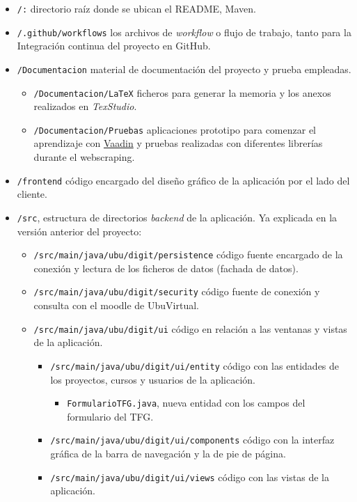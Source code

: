 \begin{itemize}
	\item \texttt{/:} directorio raíz donde se ubican el README, Maven. 
	\item \texttt{/.github/workflows} los archivos de \textit{workflow} o flujo de trabajo, tanto para la Integración continua del proyecto en GitHub.
	\item \texttt{/Documentacion} material de documentación del proyecto y prueba empleadas.
	\begin{itemize}
		\tightlist
		\item \texttt{/Documentacion/LaTeX} ficheros para generar la memoria y los anexos realizados en \emph{TexStudio}.
		\item \texttt{/Documentacion/Pruebas} aplicaciones prototipo para comenzar el aprendizaje con \href{https://vaadin.com/}{Vaadin} y pruebas realizadas con diferentes librerías durante el webscraping.
	\end{itemize}
	\item \texttt{/frontend} código encargado del diseño gráfico de la aplicación por el lado del cliente.
	\item \texttt{/src}, estructura de directorios \emph{backend} de la aplicación. Ya explicada en la versión anterior del proyecto:
		\begin{itemize}
			\item \texttt{/src/main/java/ubu/digit/persistence} código fuente encargado de la conexión y lectura de los ficheros de datos (fachada de datos).		
			\item \texttt{/src/main/java/ubu/digit/security} código fuente de conexión y consulta con el moodle de UbuVirtual.
			\item \texttt{/src/main/java/ubu/digit/ui} código en relación a las ventanas y vistas de la aplicación.
			\begin{itemize}
				\item \texttt{/src/main/java/ubu/digit/ui/entity} código con las entidades de los proyectos, cursos y usuarios de la aplicación.
					\begin{itemize}		
						\item \texttt{FormularioTFG.java}, nueva entidad con los campos del formulario del TFG.
					\end{itemize}
				\item \texttt{/src/main/java/ubu/digit/ui/components} código con la interfaz gráfica de la barra de navegación y la de pie de página.
				\item \texttt{/src/main/java/ubu/digit/ui/views} código con las vistas de la aplicación.

\end{itemize}
\end{itemize}
\end{itemize}

